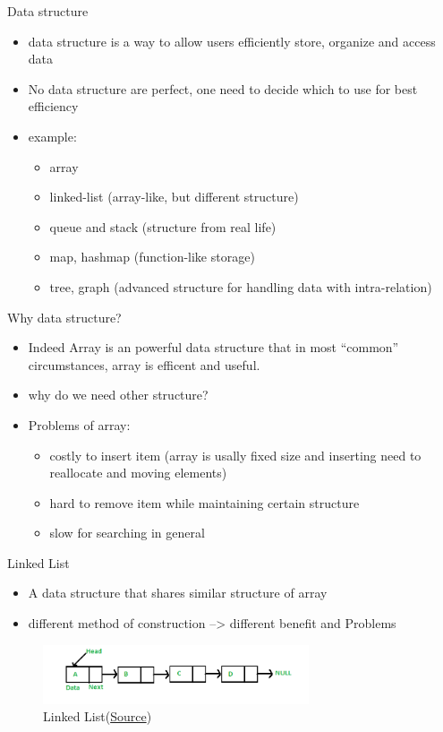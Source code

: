\documentclass[10pt,xcolor={table,dvipsnames},t]{beamer}
\begin{document}
\begin{frame}{Data structure}
  \begin{itemize}
    \item data structure is a way to allow users efficiently store, organize and access data
    \item No data structure are perfect, one need to decide which to use for best efficiency
    \item example:
    \begin{itemize}
      \item array
      \item linked-list (array-like, but different structure)
      \item queue and stack (structure from real life)
      \item map, hashmap (function-like storage)
      \item tree, graph (advanced structure for handling data with intra-relation)
    \end{itemize}
  \end{itemize}
\end{frame}

\begin{frame}{Why data structure?}
  \begin{itemize}
    \item Indeed Array is an powerful data structure that in most ``common'' circumstances, array is efficent and useful.
    \item why do we need other structure?
    \item Problems of array:
    \begin{itemize}
      \item costly to insert item (array is usally fixed size and inserting need to reallocate and moving elements)
      \item hard to remove item while maintaining certain structure
      \item slow for searching in general
    \end{itemize}
  \end{itemize}
\end{frame}

\begin{frame}{Linked List}
  \begin{itemize}
    \item A data structure that shares similar structure of array
    \item different method of construction --> different benefit and Problems
  \end{itemize}
  \begin{figure}[h!]
    \includegraphics[width=0.7\textwidth]{img/Linkedlist.png}
    \caption{Linked List(\href{https://www.geeksforgeeks.org/data-structures/linked-list/}{Source})}
  \end{figure}
\end{frame}
\end{document}
